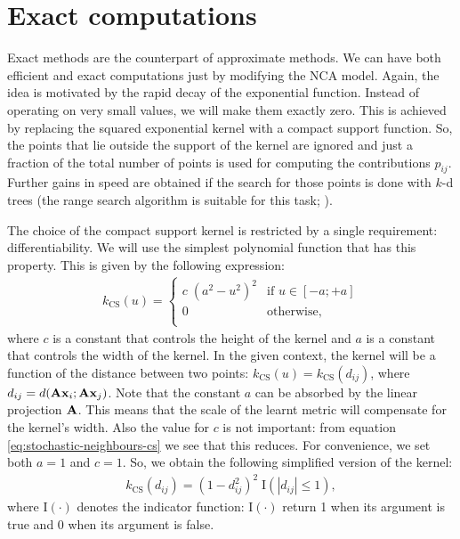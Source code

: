 	
	
\section{Exact computations}
\label{sec:exact-computations}

	Exact methods are the counterpart of approximate methods. We can have both efficient and exact computations just by modifying the NCA model. Again, the idea is motivated by the rapid decay of the
	exponential function. Instead of operating on very small values, we will make them exactly zero. This is achieved by replacing the squared exponential kernel with a compact support function. So, the points that lie outside the support of the kernel are ignored and just a fraction of the total number of points is used for computing the contributions $p_{ij}$. Further gains in speed are obtained if the search for those points is done with $k$-d trees (the range search algorithm is suitable for this task; \citealp{moore1991}).
	
	The choice of the compact support kernel is restricted by a single requirement: differentiability. We will use the simplest polynomial function that has this property. This is given by the
	following expression:
	\begin{align}
		k_{\text{CS}}(u)=\begin{cases}
			c\;(a^2-u^2)^2& \mbox{if } u \in [-a;+a]\\
			0& \mbox{otherwise},\\
		\end{cases}
		\label{eq:cs-1}
	\end{align}
	where $c$ is a constant that controls the height of the kernel and $a$ is a constant that controls the width of the kernel. In the given context, the kernel will be a function of the distance between two points: $k_{\text{CS}}(u)=k_{\text{CS}}(d_{ij})$, where $d_{ij} = d(\mathbf{A}\mathbf{x}_i;\mathbf{A}\mathbf{x}_j)$. Note that the constant $a$ can be absorbed by the linear projection $\mathbf{A}$. This means that the scale of the learnt metric will compensate for the kernel's width. Also the value for $c$ is not important: from equation \eqref{eq:stochastic-neighbours-cs} we see that this reduces. For convenience, we set both $a=1$ and $c=1$. So, we obtain the following simplified version of the kernel:
	\begin{align}
		k_{\text{CS}}(d_{ij})= (1-d_{ij}^2)^2\;\mathrm{I}(\left|d_{ij}\right|\le1),
	\end{align}
	where $\mathrm{I}(\cdot)$ denotes the indicator function: $\mathrm{I}(\cdot)$ return 1 when its argument is
	true and 0 when its argument is false.
	
